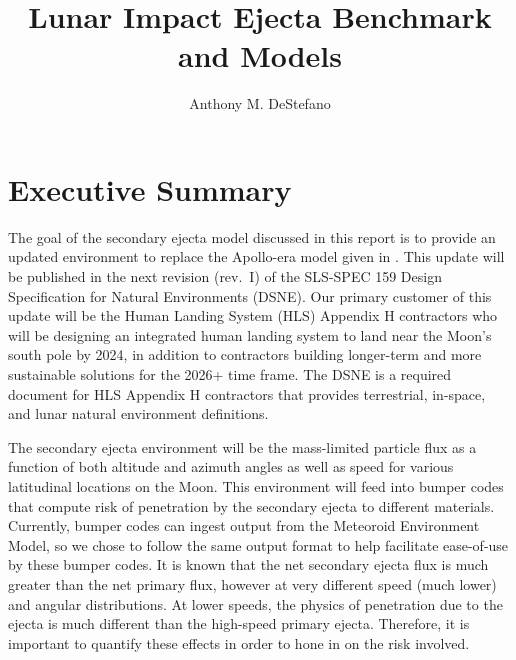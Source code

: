 \documentclass{hitec}
\title{Lunar Impact Ejecta Benchmark and Models}
\author{Anthony M. DeStefano}
\numberwithin{equation}{section}
\begin{document}
\maketitle
{}

\tableofcontents
\listoffigures
\listoftables
\newpage






\cleardoublepage
{}
\section{Executive Summary}

The goal of the secondary ejecta model discussed in this report is to provide an updated environment to replace the Apollo-era model given in \cite{cour1969meteoroid}. This update will be published in the next revision (rev.\ I) of the SLS-SPEC 159 Design Specification for Natural Environments (DSNE). Our primary customer of this update will be the Human Landing System (HLS) Appendix H contractors who will be designing an integrated human landing system to land near the Moon's south pole by 2024, in addition to contractors building longer-term and more sustainable solutions for the 2026+ time frame. The DSNE is a required document for HLS Appendix H contractors that provides terrestrial, in-space, and lunar natural environment definitions.

The secondary ejecta environment will be the mass-limited particle flux as a function of both altitude and azimuth angles as well as speed for various latitudinal locations on the Moon. This environment will feed into bumper codes that compute risk of penetration by the secondary ejecta to different materials. Currently, bumper codes can ingest output from the Meteoroid Environment Model, so we chose to follow the same output format to help facilitate ease-of-use by these bumper codes. It is known that the net secondary ejecta flux is much greater than the net primary flux, however at very different speed (much lower) and angular distributions. At lower speeds, the physics of penetration due to the ejecta is much different than the high-speed primary ejecta. Therefore, it is important to quantify these effects in order to hone in on the risk involved.
\end{document}
